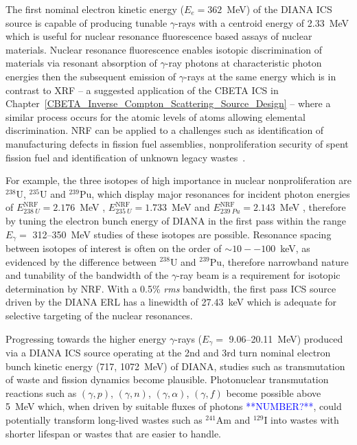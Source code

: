 \documentclass[../main.tex]{subfiles}
\begin{document}
The first nominal electron kinetic energy ($E_{e} = 362$~\si{\mega\electronvolt}) of the DIANA ICS source is capable of producing tunable $\gamma$-rays with a centroid energy of 2.33~\si{\mega\electronvolt} which is useful for nuclear resonance fluorescence based assays of nuclear materials. Nuclear resonance fluorescence enables isotopic discrimination of materials via resonant absorption of $\gamma$-ray photons at characteristic photon energies then the subsequent emission of $\gamma$-rays at the same energy which is in contrast to XRF -- a suggested application of the CBETA ICS in Chapter~\ref{CBETA_Inverse_Compton_Scattering_Source_Design} -- where a similar process occurs for the atomic levels of atoms allowing elemental discrimination. NRF can be applied to a challenges such as identification of manufacturing defects in fission fuel assemblies, nonproliferation security of spent fission fuel and identification of unknown legacy wastes~\cite{angal2018perle,angell2015demonstration,bolind2015states,geddes2017impact,kwan2011discrete}.

For example, the three isotopes of high importance in nuclear nonproliferation are $^{238}\mathrm{U}$, $^{235}\mathrm{U}$ and $^{239}\mathrm{Pu}$, which display major resonances for incident photon energies of $E_{238~U}^{\mathrm{NRF}} = 2.176$~\si{\mega\electronvolt} \cite{quiter2011transmission},  $E_{235~U}^{\mathrm{NRF}} = 1.733$~\si{\mega\electronvolt} and  $E_{239~Pu}^{\mathrm{NRF}} = 2.143$~\si{\mega\electronvolt} \cite{hayakawa2010nondestructive}, therefore by tuning the electron bunch energy of DIANA in the first pass within the range $E_{\gamma} =$ 312--350~\si{\mega\electronvolt} studies of these isotopes are possible. Resonance spacing between isotopes of interest is often on the order of $\sim10--100$~\si{\kilo\electronvolt}, as evidenced by the difference between $^{238}\mathrm{U}$ and $^{239}\mathrm{Pu}$, therefore narrowband nature and tunability of the bandwidth of the $\gamma$-ray beam is a requirement for isotopic determination by NRF. With a 0.5\% \textit{rms} bandwidth, the first pass ICS source driven by the DIANA ERL has a linewidth of 27.43~\si{\kilo\electronvolt} which is adequate for selective targeting of the nuclear resonances.    

Progressing towards the higher energy $\gamma$-rays ($E_{\gamma} =$ 9.06--20.11~\si{\mega\electronvolt}) produced via a DIANA ICS source operating at the 2nd and 3rd turn nominal electron bunch kinetic energy (717, 1072~\si{\mega\electronvolt}) of DIANA, studies such as transmutation of waste and fission dynamics become plausible. Photonuclear transmutation reactions such as $(\gamma,p)$, $(\gamma,n)$, $(\gamma,\alpha)$, $(\gamma,f)$ become possible above 5~\si{\mega\electronvolt} which, when driven by suitable fluxes of photons \textcolor{blue}{**NUMBER?**}, could potentially transform long-lived wastes such as $^{241}\mathrm{Am}$ and $^{129}\mathrm{I}$ into wastes with shorter lifespan or wastes that are easier to handle. 
\end{document}
